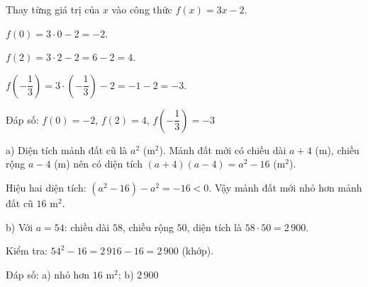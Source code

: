 \begin{problem}[8DS-HSBN-001]
Thay từng giá trị của $x$ vào công thức $f(x) = 3x - 2$.

$f(0) = 3 \cdot 0 - 2 = -2$.

$f(2) = 3 \cdot 2 - 2 = 6 - 2 = 4$.

$f\left(-\dfrac{1}{3}\right) = 3 \cdot \left(-\dfrac{1}{3}\right) - 2 = -1 - 2 = -3$.

Đáp số: $f(0) = -2$, $f(2) = 4$, $f\left(-\dfrac{1}{3}\right) = -3$
\end{problem}

\begin{problem}[8DS-HDT-013]
a) Diện tích mảnh đất cũ là $a^2$ (m$^2$). Mảnh đất mới có chiều dài $a + 4$ (m), chiều rộng $a - 4$ (m) nên có diện tích $(a + 4)(a - 4) = a^2 - 16$ (m$^2$).

Hiệu hai diện tích: $(a^2 - 16) - a^2 = -16 < 0$. Vậy mảnh đất mới nhỏ hơn mảnh đất cũ $16$ m$^2$.

b) Với $a = 54$: chiều dài $58$, chiều rộng $50$, diện tích là $58 \cdot 50 = 2\,900$.

Kiểm tra: $54^2 - 16 = 2\,916 - 16 = 2\,900$ (khớp).

Đáp số: a) nhỏ hơn $16$ m$^2$; b) $2\,900$
\end{problem}
